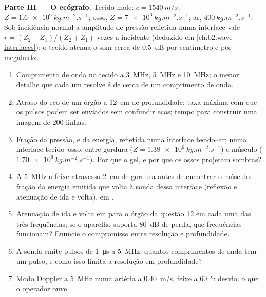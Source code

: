 \begin{problem}
\medskip
\noindent\textbf{Parte III --- O ecógrafo.}
Tecido mole: $c = \qty{1540}{m/s}$, $Z = \qty{1.6e6}{kg.m^{-2}.s^{-1}}$; osso,
$Z = \qty{7e6}{kg.m^{-2}.s^{-1}}$; ar, $\qty{400}{kg.m^{-2}.s^{-1}}$. Sob incidência
normal a amplitude de pressão refletida numa interface vale $r = (Z_2 -
Z_1)/(Z_2 + Z_1)$ vezes a incidente (deduzido em
\cref{ch:b2:wave-interfaces}); o tecido atenua o som cerca de
\qty{0.5}{dB} por centímetro e por megahertz.
\begin{enumerate}[resume]
  \item Comprimento de onda no tecido a \qty{3}{MHz}, \qty{5}{MHz} e \qty{10}{MHz}; o
        menor detalhe que cada um resolve é de cerca de um comprimento de onda.
  \item Atraso do eco de um órgão a \qty{12}{cm} de profundidade; taxa máxima com que
        os pulsos podem ser enviados sem confundir ecos; tempo para construir uma
        imagem de $200$ linhas.
  \item Fração da pressão, e da energia, refletida numa interface
        tecido--ar; numa interface tecido--osso; entre gordura
        ($Z = \qty{1.38e6}{kg.m^{-2}.s^{-1}}$) e músculo
        ($\qty{1.70e6}{kg.m^{-2}.s^{-1}}$). Por que o gel, e por que os ossos projetam
        sombras?
  \item A \qty{5}{MHz} o feixe atravessa \qty{2}{cm} de gordura antes de encontrar
        o músculo: fração da energia emitida que volta à
        sonda dessa interface (reflexão e atenuação de ida e
        volta), em .
  \item Atenuação de ida e volta em  para o órgão da questão 12
        em cada uma das três frequências; se o aparelho suporta
        \qty{80}{dB} de perda, que frequências funcionam? Enuncie o compromisso
        entre resolução e profundidade.
  \item A sonda emite pulsos de \qty{1}{\micro s} a \qty{5}{MHz}: quantos
        comprimentos de onda tem um pulso, e como isso limita a resolução
        em profundidade?
  \item Modo Doppler a \qty{5}{MHz} numa artéria a \qty{0.40}{m/s}, feixe a
        \qty{60}{\degree}: desvio; o que o operador ouve.
\end{enumerate}


\end{problem}
